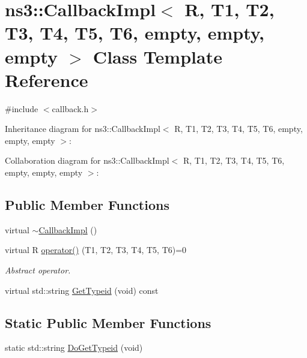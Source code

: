 \hypertarget{classns3_1_1CallbackImpl_3_01R_00_01T1_00_01T2_00_01T3_00_01T4_00_01T5_00_01T6_00_01empty_00_01empty_00_01empty_01_4}{}\section{ns3\+:\+:Callback\+Impl$<$ R, T1, T2, T3, T4, T5, T6, empty, empty, empty $>$ Class Template Reference}
\label{classns3_1_1CallbackImpl_3_01R_00_01T1_00_01T2_00_01T3_00_01T4_00_01T5_00_01T6_00_01empty_00_01empty_00_01empty_01_4}


{\ttfamily \#include $<$callback.\+h$>$}



Inheritance diagram for ns3\+:\+:Callback\+Impl$<$ R, T1, T2, T3, T4, T5, T6, empty, empty, empty $>$\+:


Collaboration diagram for ns3\+:\+:Callback\+Impl$<$ R, T1, T2, T3, T4, T5, T6, empty, empty, empty $>$\+:
\subsection*{Public Member Functions}
\begin{DoxyCompactItemize}
\item 
virtual \hyperlink{classns3_1_1CallbackImpl_3_01R_00_01T1_00_01T2_00_01T3_00_01T4_00_01T5_00_01T6_00_01empty_00_01empty_00_01empty_01_4_a4d5edff96f11810644e09c57a274b673}{$\sim$\+Callback\+Impl} ()
\item 
virtual R \hyperlink{classns3_1_1CallbackImpl_3_01R_00_01T1_00_01T2_00_01T3_00_01T4_00_01T5_00_01T6_00_01empty_00_01empty_00_01empty_01_4_af814858fa4f122c19ee1a433fb8e1733}{operator()} (T1, T2, T3, T4, T5, T6)=0
\begin{DoxyCompactList}\small\item\em Abstract operator. \end{DoxyCompactList}\item 
virtual std\+::string \hyperlink{classns3_1_1CallbackImpl_3_01R_00_01T1_00_01T2_00_01T3_00_01T4_00_01T5_00_01T6_00_01empty_00_01empty_00_01empty_01_4_ac928bcf353e31485ac864039a3506e90}{Get\+Typeid} (void) const 
\end{DoxyCompactItemize}
\subsection*{Static Public Member Functions}
\begin{DoxyCompactItemize}
\item 
static std\+::string \hyperlink{classns3_1_1CallbackImpl_3_01R_00_01T1_00_01T2_00_01T3_00_01T4_00_01T5_00_01T6_00_01empty_00_01empty_00_01empty_01_4_aa4ae4de1e1889cd5f58bd303a351ed16}{Do\+Get\+Typeid} (void)
\end{DoxyCompactItemize}
